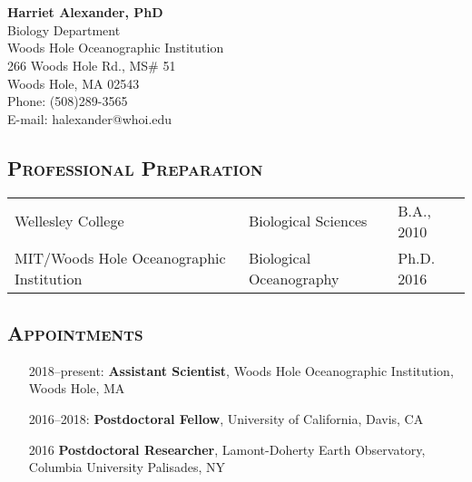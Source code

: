 \documentclass[svgnames,11pt]{article}
\date{}
\author{}
\begin{document}

\section*{}
\textbf{\large{Harriet Alexander, PhD}}\\
Biology Department\\
Woods Hole Oceanographic Institution\\
266 Woods Hole Rd., MS\# 51\\
Woods Hole, MA 02543\\
Phone: (508)289-3565\\
E-mail: halexander@whoi.edu\\


\subsection*{\textsc{Professional Preparation}}

\begin{tabular}{ l l l }
 Wellesley College & Biological Sciences & B.A., 2010 \\
 MIT/Woods Hole Oceanographic Institution & Biological Oceanography & Ph.D. 2016 \\
\end{tabular}


\subsection*{\textsc{Appointments}}

\begin{itemize}[label={--9999:},leftmargin=*,itemsep=0pt]

    \item[2018--present:]
        \textbf{Assistant Scientist},
        Woods Hole Oceanographic Institution,
        Woods Hole, MA

    \item[2016--2018:]
        \textbf{Postdoctoral Fellow},
        University of California, Davis, CA

    \item[2016]
        \textbf{Postdoctoral Researcher},
        Lamont-Doherty Earth Observatory, Columbia University
        Palisades, NY

\end{itemize}
\end{document}
